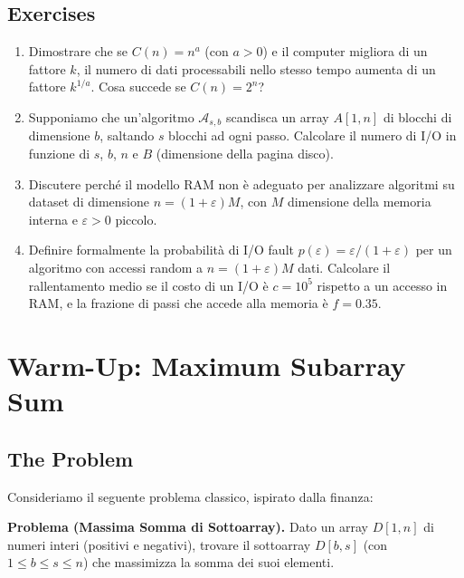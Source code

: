 \documentclass[12pt, a4paper, oneside]{book}
\theoremstyle{plain}
\theoremstyle{definition}
\theoremstyle{remark}
\begin{document}
\section{Exercises}

\begin{enumerate}
  \item Dimostrare che se $C(n) = n^a$ (con $a > 0$) e il computer migliora di un fattore $k$, il numero di dati processabili nello stesso tempo aumenta di un fattore $k^{1/a}$. Cosa succede se $C(n) = 2^n$?

  \item Supponiamo che un'algoritmo $\mathcal{A}_{s,b}$ scandisca un array $A[1,n]$ di blocchi di dimensione $b$, saltando $s$ blocchi ad ogni passo. Calcolare il numero di I/O in funzione di $s$, $b$, $n$ e $B$ (dimensione della pagina disco).

  \item Discutere perché il modello RAM non è adeguato per analizzare algoritmi su dataset di dimensione $n = (1+\varepsilon)M$, con $M$ dimensione della memoria interna e $\varepsilon > 0$ piccolo.

  \item Definire formalmente la probabilità di I/O fault $p(\varepsilon) = \varepsilon/(1+\varepsilon)$ per un algoritmo con accessi random a $n=(1+\varepsilon)M$ dati. Calcolare il rallentamento medio se il costo di un I/O è $c = 10^5$ rispetto a un accesso in RAM, e la frazione di passi che accede alla memoria è $f = 0.35$.
\end{enumerate}

\chapter{Warm-Up: Maximum Subarray Sum}

\section{The Problem}

Consideriamo il seguente problema classico, ispirato dalla finanza:

\begin{problembox}
\textbf{Problema (Massima Somma di Sottoarray).} Dato un array $D[1,n]$ di numeri interi (positivi e negativi), trovare il sottoarray $D[b,s]$ (con $1 \le b \le s \le n$) che massimizza la somma dei suoi elementi.
\end{problembox}
\end{document}
